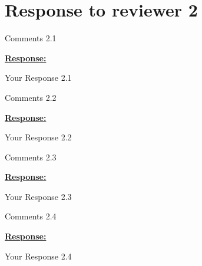 \documentclass{article}
\begin{document}
\section{Response to reviewer 2}

\begin{cmt}{}{}

Comments 2.1

\end{cmt}
\vspace{0.1cm}
\noindent
\underline{\textbf{Response:}}
\vspace{0.2cm}

Your Response 2.1

\vspace{0.3cm}


\begin{cmt}{}{}

Comments 2.2

\end{cmt}
\vspace{0.1cm}
\noindent
\underline{\textbf{Response:}}
\vspace{0.2cm}

Your Response 2.2

\vspace{0.3cm}


\begin{cmt}{}{}

Comments 2.3

\end{cmt}
\vspace{0.1cm}
\noindent
\underline{\textbf{Response:}}
\vspace{0.2cm}

Your Response 2.3

\vspace{0.3cm}


\begin{cmt}{}{}

Comments 2.4

\end{cmt}
\vspace{0.1cm}
\noindent
\underline{\textbf{Response:}}
\vspace{0.2cm}

Your Response 2.4

\vspace{0.3cm}
\end{document}
